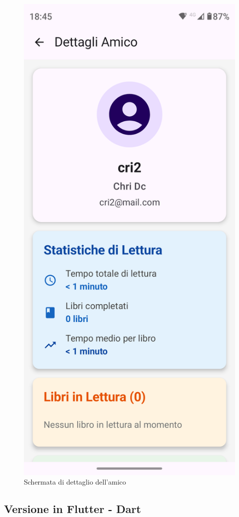 \documentclass{article}
\begin{document}
\begin{figure}[H]
  \centering
  \includegraphics[width=0.6\linewidth]{friend-screen.png}
  \caption{Schermata di dettaglio dell'amico}
  \label{fig:sitemap}
\end{figure}

\subsection{Versione in Flutter - Dart}
\end{document}
